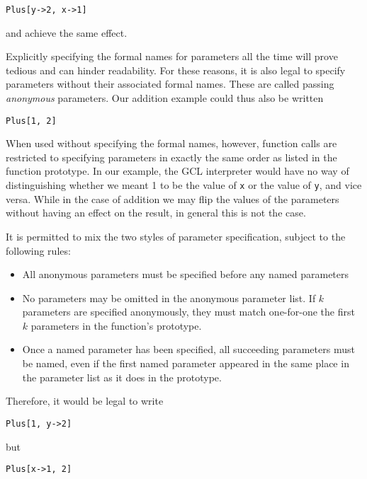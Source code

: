 \begin{verbatim}
Plus[y->2, x->1]
\end{verbatim}

\noindent and achieve the same effect.

Explicitly specifying the formal names for parameters all the time
will prove tedious and can hinder readability.  For these reasons, it is
also legal to specify parameters without their associated formal names.
These are called passing {\it anonymous} parameters.  Our addition
example could thus also be written

\begin{verbatim}
Plus[1, 2]
\end{verbatim}

When used without specifying the formal names, however, function
calls are restricted to specifying parameters in exactly the same
order as listed in the function prototype.  In our example, the GCL
interpreter would have no way of distinguishing whether we meant 1 to
be the value of \verb+x+ or the value of \verb+y+, and vice versa.
While in the case of addition we may flip the values of the parameters
without having an effect on the result, in general this is not the
case.

It is permitted to mix the two styles of parameter specification,
subject to the following rules:

\begin{itemize}
\item All anonymous parameters must be specified before any named
parameters
\item No parameters may be omitted in the anonymous parameter list.
If $k$ parameters are specified anonymously, they must match
one-for-one the first $k$ parameters in the function's prototype.
\item Once a named parameter has been specified, all succeeding
parameters must be named, even if the first named parameter appeared
in the same place in the parameter list as it does in the prototype.
\end{itemize}

\noindent Therefore, it would be legal to write

\begin{verbatim}
Plus[1, y->2]
\end{verbatim}

\noindent but

\begin{verbatim}
Plus[x->1, 2]
\end{verbatim}

